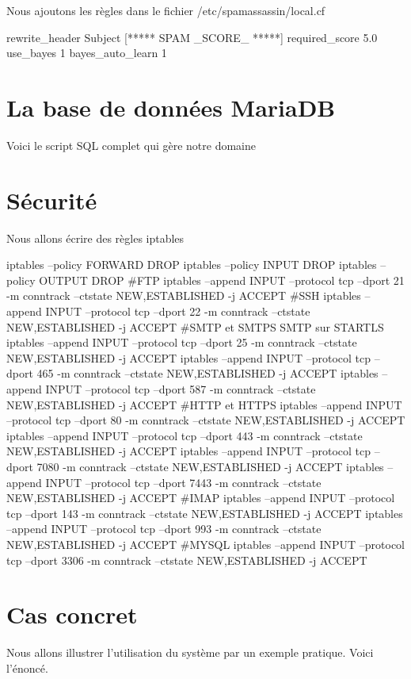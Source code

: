 \documentclass[a4paper,12pt,french]{report} %
\begin{document}
Nous ajoutons les règles dans le fichier /etc/spamassassin/local.cf
\begin{exempleConsole}
rewrite_header Subject [***** SPAM _SCORE_ *****]
required_score 5.0
use_bayes 1
bayes_auto_learn 1
\end{exempleConsole}

\section{La base de données MariaDB}
Voici le script SQL complet qui gère notre domaine
\cesure
{}
\nocesure
\section{ Sécurité}
Nous allons écrire des règles iptables 
\begin{exempleConsole}
iptables --policy FORWARD DROP
iptables --policy INPUT  DROP
iptables --policy OUTPUT  DROP
#FTP
iptables --append INPUT --protocol tcp --dport 21 -m conntrack --ctstate NEW,ESTABLISHED -j ACCEPT
#SSH
iptables --append INPUT --protocol tcp --dport 22 -m conntrack --ctstate NEW,ESTABLISHED -j ACCEPT
#SMTP et SMTPS SMTP sur STARTLS
iptables --append INPUT --protocol tcp --dport 25 -m conntrack --ctstate NEW,ESTABLISHED -j ACCEPT
iptables --append INPUT --protocol tcp --dport 465 -m conntrack --ctstate NEW,ESTABLISHED -j ACCEPT
iptables --append INPUT --protocol tcp --dport 587 -m conntrack --ctstate NEW,ESTABLISHED -j ACCEPT
#HTTP et HTTPS
iptables --append INPUT --protocol tcp --dport 80 -m conntrack --ctstate NEW,ESTABLISHED -j ACCEPT
iptables --append INPUT --protocol tcp --dport 443 -m conntrack --ctstate NEW,ESTABLISHED -j ACCEPT
iptables --append INPUT --protocol tcp --dport 7080 -m conntrack --ctstate NEW,ESTABLISHED -j ACCEPT
iptables --append INPUT --protocol tcp --dport 7443 -m conntrack --ctstate NEW,ESTABLISHED -j ACCEPT
#IMAP
iptables --append INPUT --protocol tcp --dport 143 -m conntrack --ctstate NEW,ESTABLISHED -j ACCEPT
iptables --append INPUT --protocol tcp --dport 993 -m conntrack --ctstate NEW,ESTABLISHED -j ACCEPT
#MYSQL
iptables --append INPUT --protocol tcp --dport 3306 -m conntrack --ctstate NEW,ESTABLISHED -j ACCEPT
\end{exempleConsole}

\section{Cas concret}\label{ref:casConret}
Nous allons illustrer l'utilisation du système par un exemple pratique. Voici l'énoncé.
\end{document}
